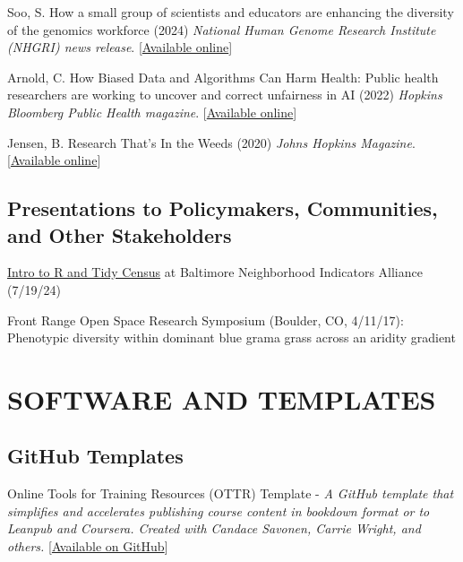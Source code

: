 \documentclass{cv}
\begin{document}
Soo, S. How a small group of scientists and educators are enhancing the diversity of the genomics workforce (2024) \textit{National Human Genome Research Institute (NHGRI) news release}. [\href{https://www.genome.gov/news/news-release/how-a-small-group-of-scientists-and-educators-are-enhancing-the-diversity-of-the-genomics-workforce}{Available online}]

Arnold, C. How Biased Data and Algorithms Can Harm Health: Public health researchers are working to uncover and correct unfairness in AI (2022) \textit{Hopkins Bloomberg Public Health magazine}. [\href{https://magazine.publichealth.jhu.edu/2022/how-biased-data-and-algorithms-can-harm-health}{Available online}]

Jensen, B. Research That's In the Weeds (2020) \textit{Johns Hopkins Magazine}. [\href{https://hub.jhu.edu/magazine/2020/winter/ava-hoffman-urban-ecology/}{Available online}]

\subsection*{Presentations to Policymakers, Communities, and Other Stakeholders}

\href{https://www.avahoffman.com/BDD24/}{Intro to R and Tidy Census} at Baltimore Neighborhood Indicators Alliance (7/19/24)

Front Range Open Space Research Symposium (Boulder, CO, 4/11/17): Phenotypic diversity within dominant blue grama grass across an aridity gradient


\section*{SOFTWARE AND TEMPLATES}

\subsection*{GitHub Templates}

Online Tools for Training Resources (OTTR) Template - \textit{A GitHub template that simplifies and accelerates publishing course content in bookdown format or to Leanpub and Coursera. Created with Candace Savonen, Carrie Wright, and others.} [\href{https://github.com/jhudsl/OTTR_Template}{Available on GitHub}]
\end{document}
